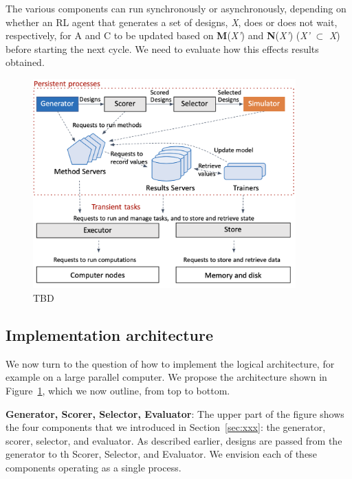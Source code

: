 \documentclass[10pt]{article}
\begin{document}
The various components can run synchronously or asynchronously, depending on whether an RL agent that generates a set of designs, \emph{X}, does or does not wait, respectively, for A and C to be updated based on \textbf{M}(\emph{X’}) and \textbf{N}(\emph{X’}) (\emph{X’} $\subset$ \emph{X})  before starting the next cycle. We need to evaluate how this effects results obtained.



\begin{figure}
  \centering
  \includegraphics[width=0.9\textwidth,trim=0in 0in 0in 0in,clip]{./Figs/arch.png}
  \vspace{-1.5ex}
  \caption{TBD}
\label{fig:arch}
\end{figure}

\subsection{Implementation architecture}

We now turn to the question of how to implement the logical architecture, for example on a large parallel computer. 
We propose the architecture shown in Figure~\ref{fig:arch}, which we now outline, from top to bottom.

\textbf{Generator, Scorer, Selector, Evaluator}: The upper part of the figure shows the four components that we introduced in Section~\ref{sec:xxx}:
the generator, scorer, selector, and evaluator. 
As described earlier, designs are passed from the generator to th Scorer, Selector, and Evaluator.
We envision each of these components operating as a single process.
\end{document}
